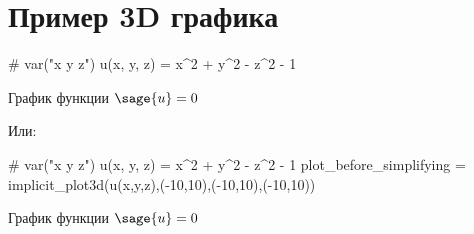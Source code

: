 \section{Пример 3D графика}
\begin{sagesilent}
	# var("x y z")
	u(x, y, z) = x^2 + y^2 - z^2 - 1
\end{sagesilent}
График функции $\sage{u} = 0$
\begin{center}
\end{center}

\noindent Или:\\
\begin{sagesilent}
	# var("x y z")
	u(x, y, z) = x^2 + y^2 - z^2 - 1
	plot_before_simplifying = implicit_plot3d(u(x,y,z),(-10,10),(-10,10),(-10,10))
\end{sagesilent}
График функции $\sage{u} = 0$
\begin{center}
\end{center}
